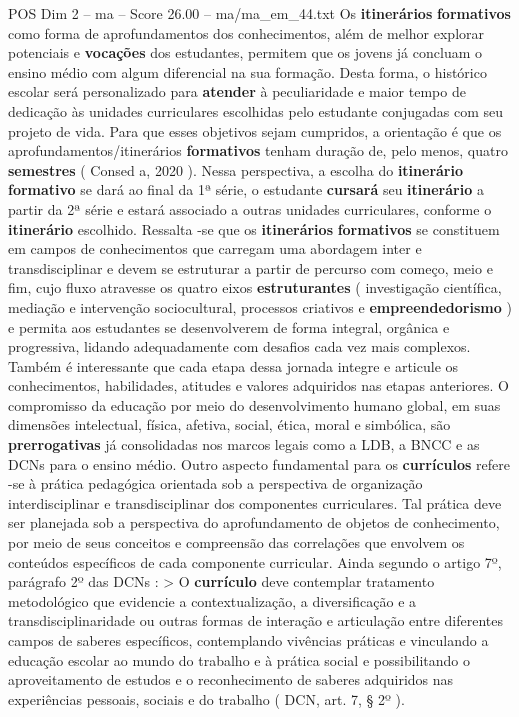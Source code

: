 \begin{textsample}{POS Dim 2 – ma – Score 26.00 – ma/ma\_em\_44.txt}
Os \textbf{itinerários} \textbf{formativos} como forma de aprofundamentos dos conhecimentos, além de melhor explorar potenciais e \textbf{vocações} dos estudantes, permitem que os jovens já concluam o ensino médio com algum diferencial na sua formação.
Desta forma, o histórico escolar será personalizado para \textbf{atender} à peculiaridade e maior tempo de dedicação às unidades curriculares escolhidas pelo estudante conjugadas com seu projeto de vida.
Para que esses objetivos sejam cumpridos, a orientação é que os aprofundamentos/itinerários \textbf{formativos} tenham duração de, pelo menos, quatro \textbf{semestres} ( Consed a, 2020 ).
Nessa perspectiva, a escolha do \textbf{itinerário} \textbf{formativo} se dará ao final da 1ª série, o estudante \textbf{cursará} seu \textbf{itinerário} a partir da 2ª série e estará associado a outras unidades curriculares, conforme o \textbf{itinerário} escolhido.
Ressalta -se que os \textbf{itinerários} \textbf{formativos} se constituem em campos de conhecimentos que carregam uma abordagem inter e transdisciplinar e devem se estruturar a partir de percurso com começo, meio e fim, cujo fluxo atravesse os quatro eixos \textbf{estruturantes} ( investigação científica, mediação e intervenção sociocultural, processos criativos e \textbf{empreendedorismo} ) e permita aos estudantes se desenvolverem de forma integral, orgânica e progressiva, lidando adequadamente com desafios cada vez mais complexos.
Também é interessante que cada etapa dessa jornada integre e articule os conhecimentos, habilidades, atitudes e valores adquiridos nas etapas anteriores.
O compromisso da educação por meio do desenvolvimento humano global, em suas dimensões intelectual, física, afetiva, social, ética, moral e simbólica, são \textbf{prerrogativas} já consolidadas nos marcos legais como a LDB, a BNCC e as DCNs para o ensino médio.
Outro aspecto fundamental para os \textbf{currículos} refere -se à prática pedagógica orientada sob a perspectiva de organização interdisciplinar e transdisciplinar dos componentes curriculares.
Tal prática deve ser planejada sob a perspectiva do aprofundamento de objetos de conhecimento, por meio de seus conceitos e compreensão das correlações que envolvem os conteúdos específicos de cada componente curricular.
Ainda segundo o artigo 7º, parágrafo 2º das DCNs : > O \textbf{currículo} deve contemplar tratamento metodológico que evidencie a contextualização, a diversificação e a transdisciplinaridade ou outras formas de interação e articulação entre diferentes campos de saberes específicos, contemplando vivências práticas e vinculando a educação escolar ao mundo do trabalho e à prática social e possibilitando o aproveitamento de estudos e o reconhecimento de saberes adquiridos nas experiências pessoais, sociais e do trabalho ( DCN, art. 7, § 2º ).

\end{textsample}
